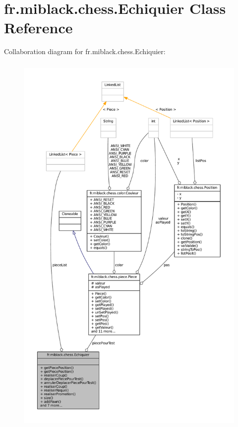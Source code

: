 \section{fr.\-miblack.\-chess.\-Echiquier Class Reference}
\label{classfr_1_1miblack_1_1chess_1_1Echiquier}


Collaboration diagram for fr.\-miblack.\-chess.\-Echiquier\-:
\nopagebreak
\begin{figure}[H]
\begin{center}
\leavevmode
\includegraphics[height=550pt]{classfr_1_1miblack_1_1chess_1_1Echiquier__coll__graph}
\end{center}
\end{figure}
